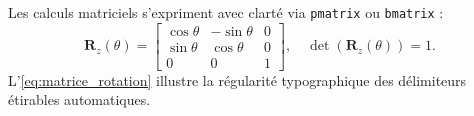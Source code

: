 Les calculs matriciels s'expriment avec clarté via \texttt{pmatrix} ou \texttt{bmatrix} :
\begin{equation}
  \label{eq:matrice_rotation}
  \mathbf{R}_z(\theta) = 
  \begin{bmatrix}
    \cos\theta & -\sin\theta & 0 \\
    \sin\theta &  \cos\theta & 0 \\
    0          &  0          & 1
  \end{bmatrix},
  \quad
  \det\left(\mathbf{R}_z(\theta)\right) = 1.
\end{equation}
L'\cref{eq:matrice_rotation} illustre la régularité typographique des délimiteurs étirables automatiques.

